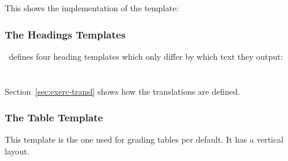 \documentclass{xsim-manual}
\begin{document}
This shows the implementation of the  template:
\begin{sourcecode}
    {%
      \par
      \textbf{}%
    }
    {\par}
\end{sourcecode}

\subsubsection{The Headings Templates}\label{sec:headings-templates}
\xsim\ defines four heading templates which only differ by which text they
output:
\begin{sourcecode}
    {\section*{}}
    {\section*{}}
    {\section*{}}
    {\section*{}}
\end{sourcecode}
Section~\vref{sec:exerc-transl} shows how the translations are defined.

\subsubsection{The  Table Template}\label{sec:table-templ-default}
This template is the one used for grading tables per default.  It has a
vertical layout.
\end{document}
